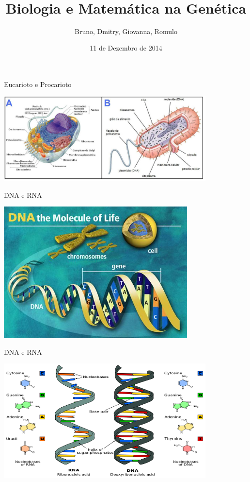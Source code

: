 \documentclass[]{beamer}
\author[]{Bruno, Dmitry, Giovanna, Romulo}
\title{Biologia e Matemática na Genética}
\institute{UFPI}
\date{11 de Dezembro de 2014}
\begin{document}
  \begin{frame}
    \titlepage
  \end{frame}


  \begin{frame}{Eucarioto e Procarioto}
    \begin{center}
      \includegraphics[width=11cm]{images/eucarioto-procarioto.png}
    \end{center}
  \end{frame}

  \begin{frame}{DNA e RNA}
    \begin{center}
      \includegraphics[width=10cm]{images/dna-e-rna-1.png}
    \end{center}
  \end{frame}

  \begin{frame}{DNA e RNA}
    \begin{center}
      \includegraphics[width=11cm]{images/dna-e-rna.png}
    \end{center}
  \end{frame}
\end{document}
